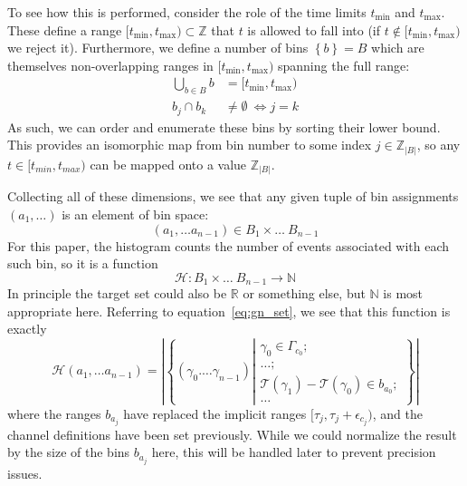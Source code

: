\documentclass{article}
\newcommand{\braces}[1]{\ensuremath{\left\lbrace #1 \right\rbrace}}
\newcommand{\integers}{\ensuremath{\mathbb{Z}}}
\newcommand{\wholes}{\ensuremath{\mathbb{N}}}
\newcommand{\reals}{\ensuremath{\mathbb{R}}}
\newcommand{\abs}[1]{\ensuremath{\left|#1\right|}}
\newcommand{\Time}{\ensuremath{\mathcal{T}}}
\newcommand{\photon}{\ensuremath{\gamma}}
\newcommand{\photons}{\ensuremath{\Gamma}}
\newcommand{\Histogram}{\ensuremath{\mathcal{H}}}
\begin{document}
To see how this is performed, consider the role of the time limits $t_{\min}$ and $t_{\max}$. These define a range $[t_{\min},t_{\max})\subset\integers$ that $t$ is allowed to fall into (if $t\not\in[t_{\min},t_{\max})$ we reject it). Furthermore, we define a number of bins $\braces{b}=B$ which are themselves non-overlapping ranges in $[t_{\min},t_{\max})$ spanning the full range:
\begin{align}
\bigcup\limits_{b\in B}{b} &= [t_{\min},t_{\max}) \\
b_{j}\cap b_{k}&\not=\emptyset~\iff j=k
\end{align} 
As such, we can order and enumerate these bins by sorting their lower bound. This provides an isomorphic map from bin number to some index $j\in\integers_{\abs{B}}$, so any $t\in[t_{min},t_{max})$ can be mapped onto a value $\integers_{\abs{B}}$. 

Collecting all of these dimensions, we see that any given tuple of bin assignments $(a_{1},\ldots)$ is an element of bin space:
\begin{equation}
(a_{1},\ldots a_{n-1})\in B_{1}\times\ldots~B_{n-1}
\end{equation}
For this paper, the histogram counts the number of events associated with each such bin, so it is a function
\begin{equation}
\Histogram:B_{1}\times\ldots~B_{n-1}\rightarrow\wholes
\end{equation}
In principle the target set could also be \reals{} or something else, but \wholes{} is most appropriate here. Referring to equation~\ref{eq:gn_set}, we see that this function is exactly
\begin{equation}
\Histogram(a_{1},\ldots a_{n-1}) = \abs{\braces{(\photon_{0}.\ldots\photon_{n-1})
                                              \left|\begin{aligned}
                                              \gamma_{0}\in\photons_{c_{0}};\\ 
                                              \ldots;\\                                              
                                              \Time(\photon_{1})-\Time(\photon_{0})\in b_{a_{0}};\\
                                              \ldots
                                              \end{aligned}\right.}}
\end{equation}
where the ranges $b_{a_{j}}$ have replaced the implicit ranges $[\tau_{j},\tau_{j}+\epsilon_{c_{j}})$, and the channel definitions have been set previously. While we could normalize the result by the size of the bins $b_{a_{j}}$ here, this will be handled later to prevent precision issues.
\end{document}
